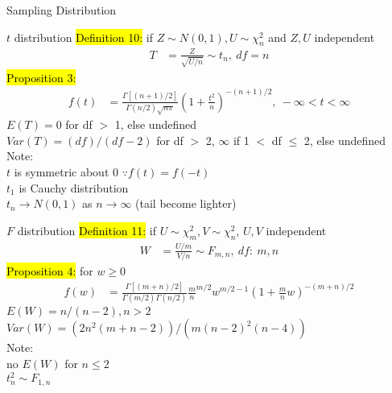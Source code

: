 \documentclass[a4paper,12pt,landscape]{article}
\begin{document}
\begin{multicols}{3}
\begin{section}{Sampling Distribution}
        \begin{subsection}{$t$ distribution}
            \hl{Definition 10:} if $Z\sim N(0, 1), U\sim\chi_n^2$ and $Z, U$ independent
             \begin{align*}
                 T &= \frac{Z}{\sqrt{U/n}} \sim t_n,~df=n
             \end{align*}
             \hl{Proposition 3:}
             \begin{align*}
                 f(t) &= \frac{\Gamma[(n+1)/2]}{\Gamma(n/2)\sqrt{n\pi}} \left(1+\frac{t^2}{n}\right)^{-(n+1)/2}, ~-\infty < t < \infty
             \end{align*}
             $E(T) = 0$ for df $>$ 1, else undefined\\
             $Var(T) = (df)/(df-2)$ for df $>$ 2, $\infty$ if 1 $<$ df $\leq$ 2, else undefined\\
             Note:\\
             $t$ is symmetric about 0 $\because f(t) = f(-t)$\\
             $t_1$ is Cauchy distribution\\
             $t_n \rightarrow N(0, 1)$ as $n\rightarrow \infty$ (tail become lighter)
        \end{subsection}

        \begin{subsection}{$F$ distribution}
            \hl{Definition 11:} if $U\sim\chi_m^2, V\sim\chi_n^2$, $U, V$ independent
            \begin{align*}
                W &= \frac{U/m}{V/n}\sim F_{m, n},~df:~m, n
            \end{align*}
            \hl{Proposition 4:} for $w\geq 0$
            \begin{align*}
                f(w) &= \frac{\Gamma[(m+n)/2]}{\Gamma(m/2)\Gamma(n/2)}{\frac{m}{n}}^{m/2}w^{m/2-1}\left(1+\frac{m}{n}w\right)^{-(m+n)/2}
            \end{align*}
            $E(W) = n/(n-2), n>2$\\
            $Var(W) = (2n^2(m+n-2))/(m(n-2)^2(n-4))$\\
            Note:\\
            no $E(W)$ for $n \leq 2$\\
            $t_n^2 \sim F_{1, n}$
        \end{subsection}


\end{section}
\end{multicols}
\end{document}
